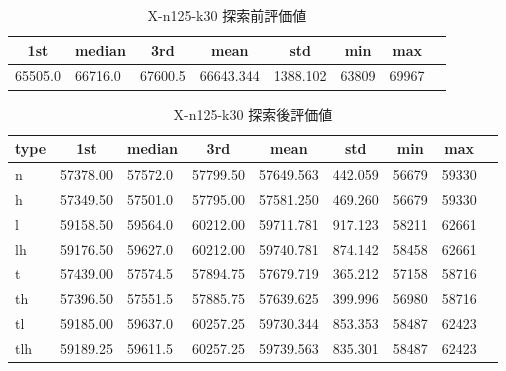 \begin{table}[htbp]
    \centering
    \caption{X-n125-k30 探索前評価値}
    \begin{tabular}{|l|l|l|l|l|l|l|l|}\hline
    \multicolumn{1}{|c|}{\textbf{1st}}
    &\multicolumn{1}{c|}{\textbf{median}}
    &\multicolumn{1}{c|}{\textbf{3rd}}
    &\multicolumn{1}{c|}{\textbf{mean}}
    &\multicolumn{1}{c|}{\textbf{std}}
    &\multicolumn{1}{c|}{\textbf{min}}
    &\multicolumn{1}{c|}{\textbf{max}}\\\hline
	65505.0 & 66716.0 & 67600.5 & 66643.344 & 1388.102 & 63809 & 69967\\\hline
	\end{tabular}
\end{table}
\begin{table}[htbp]
    \centering
    \caption{X-n125-k30 探索後評価値}
    \begin{tabular}{|l|l|l|l|l|l|l|l|l|}\hline
    \multicolumn{1}{|c|}{\textbf{type}}
    &\multicolumn{1}{|c|}{\textbf{1st}}
    &\multicolumn{1}{c|}{\textbf{median}}
    &\multicolumn{1}{c|}{\textbf{3rd}}
    &\multicolumn{1}{c|}{\textbf{mean}}
    &\multicolumn{1}{c|}{\textbf{std}}
    &\multicolumn{1}{c|}{\textbf{min}}
    &\multicolumn{1}{c|}{\textbf{max}}\\\hline
	n & 57378.00 & 57572.0 & 57799.50 & 57649.563 & 442.059 & 56679 & 59330\\\hline
	h & 57349.50 & 57501.0 & 57795.00 & 57581.250 & 469.260 & 56679 & 59330\\\hline
	l & 59158.50 & 59564.0 & 60212.00 & 59711.781 & 917.123 & 58211 & 62661\\\hline
	lh & 59176.50 & 59627.0 & 60212.00 & 59740.781 & 874.142 & 58458 & 62661\\\hline
	t & 57439.00 & 57574.5 & 57894.75 & 57679.719 & 365.212 & 57158 & 58716\\\hline
	th & 57396.50 & 57551.5 & 57885.75 & 57639.625 & 399.996 & 56980 & 58716\\\hline
	tl & 59185.00 & 59637.0 & 60257.25 & 59730.344 & 853.353 & 58487 & 62423\\\hline
	tlh & 59189.25 & 59611.5 & 60257.25 & 59739.563 & 835.301 & 58487 & 62423\\\hline
	\end{tabular}
\end{table}
